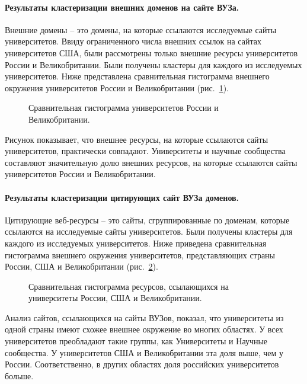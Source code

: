\paragraph{Результаты кластеризации внешних доменов на сайте ВУЗа.} Внешние домены -- это домены, на которые ссылаются исследуемые сайты университетов. Ввиду ограниченного числа внешних ссылок на сайтах университетов США, были рассмотрены только внешние ресурсы университетов России и Великобритании. Были получены кластеры для каждого из исследуемых университетов. Ниже представлена сравнительная гистограмма внешнего окружения университетов России и Великобритании (рис.~\cref{fig:histogramUKRU}).

\begin{figure}[ht]
	\caption{Сравнительная гистограмма университетов России и Великобритании.}\label{fig:histogramUKRU}
\end{figure}

Рисунок показывает, что внешнее ресурсы, на которые ссылаются сайты университетов, практически совпадают. Университеты и научные сообщества составляют значительную долю внешних ресурсов, на которые ссылаются сайты университетов России и Великобритании.

\paragraph{Результаты кластеризации цитирующих сайт ВУЗа доменов.} Цитирующие веб-ресурсы -- это сайты, сгруппированные по доменам, которые ссылаются на исследуемые сайты университетов. Были получены кластеры для каждого из исследуемых университетов. Ниже приведена сравнительная гистограмма внешнего окружения университетов, представляющих страны России, США и Великобритании (рис.~\cref{fig:histogramUKRUUS}).

\begin{figure}[ht]
	\caption{Сравнительная гистограмма ресурсов, ссылающихся на университеты России, США и Великобритании.}\label{fig:histogramUKRUUS}
\end{figure}

Анализ сайтов, ссылающихся на сайты ВУЗов, показал, что университеты из одной страны имеют схожее внешнее окружение во многих областях. У всех университетов преобладают такие группы, как Университеты и Научные сообщества. У университетов США и Великобритании эта доля выше, чем у России. Соответственно, в других областях доля российских университетов больше.


